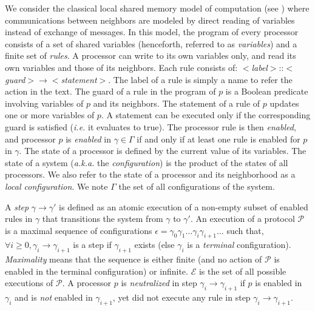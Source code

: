 \documentclass[11pt,english,letterpaper]{article}
\begin{document}
We consider the classical local shared memory model of computation (see \cite{D00b}) where communications between neighbors are modeled by direct reading of variables instead of exchange of messages. In this model, the program of every processor consists of a set of shared variables (henceforth, referred to as \emph{variables}) and a finite set of \emph{rules}. A processor can write to its own variables only, and read its own variables and those of its neighbors. Each rule consists of: $<$\emph{label}$>$::$<$\emph{guard}$>\longrightarrow<$\emph{statement}$>$. The label of a rule is simply a name to refer the action in the text. The guard of a rule in the program of $p$ is a Boolean predicate involving variables of $p$ and its neighbors. The statement of a rule of $p$ updates one or more variables of $p$. A statement can be executed only if the corresponding guard is satisfied (\emph{i.e.} it evaluates to true). The processor rule is then \emph{enabled}, and processor $p$ is \emph{enabled} in $\gamma\in \Gamma$ if and only if at least one rule is enabled for $p$ in $\gamma$. The state of a processor is defined by the current value of its variables. The state of a system (\emph{a.k.a.} the \emph{configuration}) is the product of the states of all processors. We also refer to the state of a processor and its neighborhood as a \emph{local configuration}. We note $\Gamma$ the set of all configurations of the system. 

A \emph{step} $\gamma\rightarrow\gamma'$ is defined as an atomic execution of a non-empty subset of enabled rules in $\gamma$ that transitions the system from $\gamma$ to $\gamma'$. An execution of a protocol $\mathcal{P}$ is a maximal sequence of configurations $\epsilon=\gamma_{0}\gamma_{1}\ldots\gamma_{i}\gamma_{i+1}\ldots$ such that, $\forall i\geq0,\gamma_{i}\rightarrow\gamma_{i+1}$ is a step if $\gamma_{i+1}$ exists (else $\gamma_{i}$ is a \emph{terminal} configuration). \emph{Maximality} means that the sequence is either finite (and no action of $\mathcal{P}$ is enabled in the terminal configuration) or infinite. $\mathcal{E}$ is the set of all possible executions of $\mathcal{P}$. A processor $p$ is \emph{neutralized} in step $\gamma_{i}\rightarrow\gamma_{i+1}$ if $p$ is enabled in $\gamma_{i}$ and is \emph{not} enabled in $\gamma_{i+1}$, yet did not execute any rule in step $\gamma_{i}\rightarrow\gamma_{i+1}$.
\end{document}
